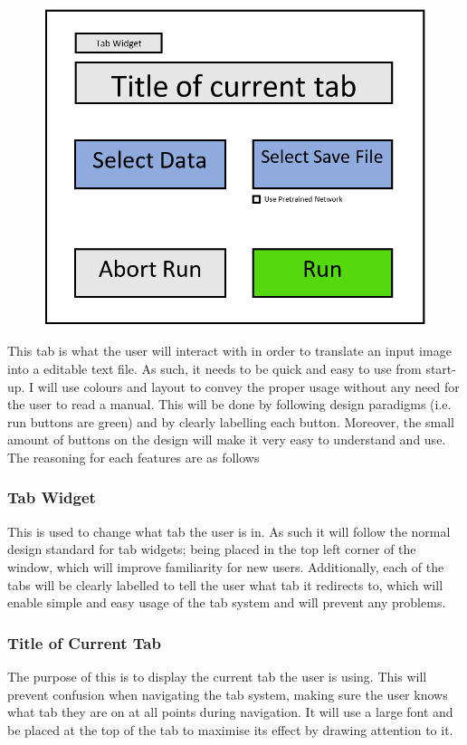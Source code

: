 \documentclass{report}
\begin{document}
\begin{figure}[H]
    \centering
    \includegraphics[width=12cm]{Images/Graphical User Interface/Translation Tab.png}
\end{figure}
\noindent This tab is what the user will interact with in order to translate an input image into a editable text file. As such, it needs to be quick and easy to use from start-up. I will use colours and layout to convey the proper usage without any need for the user to read a manual. This will be done by following design paradigms (i.e. run buttons are green) and by clearly labelling each button. Moreover, the small amount of buttons on the design will make it very easy to understand and use. The reasoning for each features are as follows

\subsubsection{Tab Widget}
This is used to change what tab the user is in. As such it will follow the normal design standard for tab widgets; being placed in the top left corner of the window, which will improve familiarity for new users. Additionally, each of the tabs will be clearly labelled to tell the user what tab it redirects to, which will enable simple and easy usage of the tab system and will prevent any problems.

\subsubsection{Title of Current Tab}
The purpose of this is to display the current tab the user is using. This will prevent confusion when navigating the tab system, making sure the user knows what tab they are on at all points during navigation. It will use a large font and be placed at the top of the tab to maximise its effect by drawing attention to it.
\end{document}
